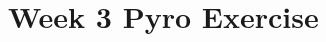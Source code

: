 \newpage
\section{Week 3 Pyro Exercise}
\label{sec:week3:code:pyro}
\inputminted{Python}{../src/week1_pyro.py}

